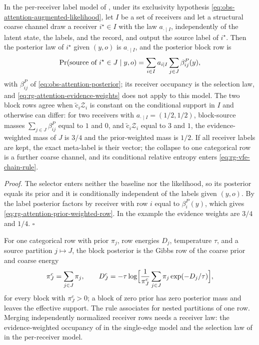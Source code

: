 In the per-receiver label model of , under its
exclusivity hypothesis \eqref{eq:obs-attention-augmented-likelihood}, let $I$ be a
set of receivers and let a structural coarse channel draw a receiver $i^\star\in I$
with the law $a_{\cdot\mid I}$, independently of the latent state, the labels, and
the record, and output the source label of $i^\star$. Then the posterior law of
$i^\star$ given $(y,o)$ is $a_{\cdot\mid I}$, and the posterior block row is
\begin{equation}
\Pr(\text{source of }i^\star\in J\mid y,o)
=\sum_{i\in I}a_{i\mid I}\sum_{j\in J}\beta^P_{ij}(y),
\label{eq:rg-attention-prior-weighted-row}
\end{equation}
with $\beta^P_{ij}$ of \eqref{eq:obs-attention-posterior}; its receiver occupancy is
the selection law, and \eqref{eq:rg-attention-evidence-weights} does not apply to
this model. The two block rows agree when $\widetilde{\mathrm c}_i\mathcal Z_i$ is
constant on the conditional support in $I$ and otherwise can differ: for two
receivers with $a_{\cdot\mid I}=(1/2,1/2)$, block-source masses $\sum_{j\in
J}\beta^P_{ij}$ equal to $1$ and $0$, and $\widetilde{\mathrm c}_i\mathcal Z_i$ equal
to $3$ and $1$, the evidence-weighted mass of $J$ is $3/4$ and the prior-weighted
mass is $1/2$. If all receiver labels are kept, the exact meta-label is their
vector; the collapse to one categorical row is a further coarse channel, and its
conditional relative entropy enters \eqref{eq:rg-vfe-chain-rule}.

\noindent\emph{Proof.}
The selector enters neither the baseline nor the likelihood, so its posterior equals
its prior and it is conditionally independent of the labels given $(y,o)$. By
 the label posterior factors by receiver with row $i$
equal to $\beta^P_i(y)$, which gives \eqref{eq:rg-attention-prior-weighted-row}. In
the example the evidence weights are $3/4$ and $1/4$. $\square$

For one categorical row with prior $\pi_j$, row energies $D_j$, temperature $\tau$,
and a source partition $j\mapsto J$, the block posterior is the Gibbs row of the
coarse prior and coarse energy
\begin{equation}
\pi^c_J=\sum_{j\in J}\pi_j,
\qquad
D^c_J=-\tau\log\Bigl[\frac1{\pi^c_J}\sum_{j\in J}\pi_j\exp(-D_j/\tau)\Bigr],
\label{eq:rg-attention-log-sum-exp}
\end{equation}
for every block with $\pi^c_J>0$; a block of zero prior has zero posterior mass and
leaves the effective support. The rule associates for nested partitions of one row.
Merging independently normalized receiver rows needs a receiver law: the
evidence-weighted occupancy of  in the
single-edge model and the selection law of
 in the per-receiver model.

